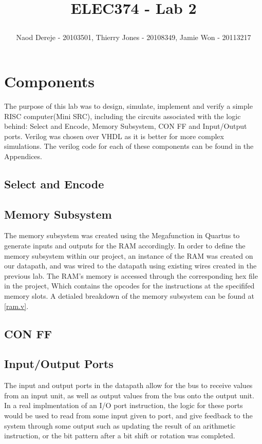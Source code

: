 \documentclass{article}
\title{
    \begin{large}
        ELEC374 - Lab 2
    \end{large}
}
\author{Naod Dereje - 20103501, Thierry Jones - 20108349, Jamie Won - 20113217}
\begin{document}
\maketitle
\cleardoublepage
\tableofcontents
\cleardoublepage


\section{Components}
    The purpose of this lab was to design, simulate, implement and verify a simple RISC computer(Mini SRC), including the circuits associated with the logic behind: 
    Select and Encode, Memory Subsystem, CON FF and Input/Output ports. Verilog was chosen over VHDL as it is better for more complex simulations. The verilog code 
    for each of these components can be found in the Appendices.
    
    \subsection{Select and Encode}


    \subsection{Memory Subsystem}
    The memory subsystem was created using the Megafunction in Quartus to generate inputs and outputs for the RAM accordingly. In order to define the memory subsystem within our project, an instance of the RAM was created on our datapath, and was wired to the datapath using existing wires created in the previous lab. The RAM's memory is accessed through the corresponding hex file in the project, Which contains the opcodes for the instructions at the specififed memory slots. A detialed breakdown of the memory subsystem can be found at \ref{ram.v}.

    \subsection{CON FF}
    

    \subsection{Input/Output Ports}
    The input and output ports in the datapath allow for the bus to receive values from an input unit, as well as output values from the bus onto the output unit. In a real implmentation of an I/O port instruction, the logic for these ports would be used to read from some input given to port, and give feedback to the system through some output such as updating the result of an arithmetic instruction, or the bit pattern after a bit shift or rotation was completed.
\end{document}
